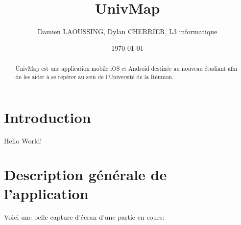 \documentclass{article}
\title{UnivMap}
\author{Damien LAOUSSING, Dylan CHERRIER, L3 informatique}
\date{\today}
\begin{document}
\maketitle %


\begin{abstract}
  UnivMap est une application mobile iOS et Android destinée au nouveau
  étudiant afin de les aider à se repérer au sein de l'Université de la Réunion.
\end{abstract}


\section{Introduction}
\label{section:intro} %

Hello World!


\section{Description générale de l'application}
Voici une belle capture d'écran d'une partie en cours:
\end{document}
